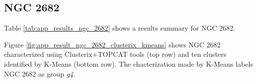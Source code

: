 \documentclass[11pt,a4paper,english,twocolumn]{article}
\begin{document}
\subsection{NGC 2682}
\label{sec:ngc2682}

Table \ref{tab:app_results_ngc_2682} shows a results summary for NGC 2682.

\begin{table}[htbp]
  \begin{center}
    \caption{NGC 2682 results.}
    \label{tab:app_results_ngc_2682}
  \end{center}
\end{table}

Figure \ref{fig:app_result_ngc_2682_clusterix_kmeans} shows
NGC 2682 characterized using Clusterix+TOPCAT tools (top row)
and ten clusters identified by K-Means (bottom row).
The chacterization made by K-Means labels NGC 2682 as group \emph{g4}.
\end{document}
